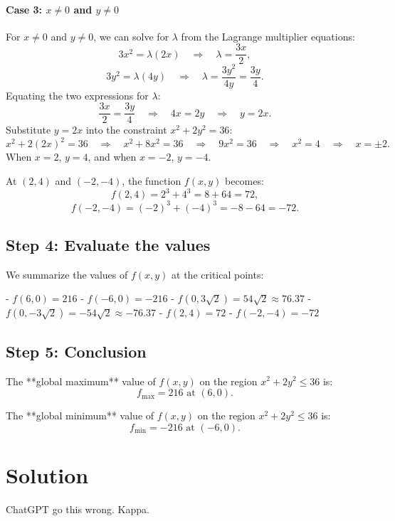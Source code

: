 \documentclass[11pt]{article}
\begin{document}
\paragraph{Case 3: \( x \neq 0 \) and \( y \neq 0 \)}
For \( x \neq 0 \) and \( y \neq 0 \), we can solve for \( \lambda \) from the Lagrange multiplier equations:
\[
3x^2 = \lambda (2x) \quad \Rightarrow \quad \lambda = \frac{3x}{2},
\]
\[
3y^2 = \lambda (4y) \quad \Rightarrow \quad \lambda = \frac{3y^2}{4y} = \frac{3y}{4}.
\]
Equating the two expressions for \( \lambda \):
\[
\frac{3x}{2} = \frac{3y}{4} \quad \Rightarrow \quad 4x = 2y \quad \Rightarrow \quad y = 2x.
\]
Substitute \( y = 2x \) into the constraint \( x^2 + 2y^2 = 36 \):
\[
x^2 + 2(2x)^2 = 36 \quad \Rightarrow \quad x^2 + 8x^2 = 36 \quad \Rightarrow \quad 9x^2 = 36 \quad \Rightarrow \quad x^2 = 4 \quad \Rightarrow \quad x = \pm 2.
\]
When \( x = 2 \), \( y = 4 \), and when \( x = -2 \), \( y = -4 \).

At \( (2, 4) \) and \( (-2, -4) \), the function \( f(x, y) \) becomes:
\[
f(2, 4) = 2^3 + 4^3 = 8 + 64 = 72,
\]
\[
f(-2, -4) = (-2)^3 + (-4)^3 = -8 - 64 = -72.
\]

\newpage

\subsection{Step 4: Evaluate the values}

We summarize the values of \( f(x, y) \) at the critical points:

- \( f(6, 0) = 216 \)
- \( f(-6, 0) = -216 \)
- \( f(0, 3\sqrt{2}) = 54\sqrt{2} \approx 76.37 \)
- \( f(0, -3\sqrt{2}) = -54\sqrt{2} \approx -76.37 \)
- \( f(2, 4) = 72 \)
- \( f(-2, -4) = -72 \)

\newpage

\subsection{Step 5: Conclusion}

The **global maximum** value of \( f(x, y) \) on the region \( x^2 + 2y^2 \leq 36 \) is:
\[
f_{\text{max}} = 216 \text{ at } (6, 0).
\]

The **global minimum** value of \( f(x, y) \) on the region \( x^2 + 2y^2 \leq 36 \) is:
\[
f_{\text{min}} = -216 \text{ at } (-6, 0).
\]




\newpage

\section{Solution}
ChatGPT go this wrong. Kappa.
\end{document}

